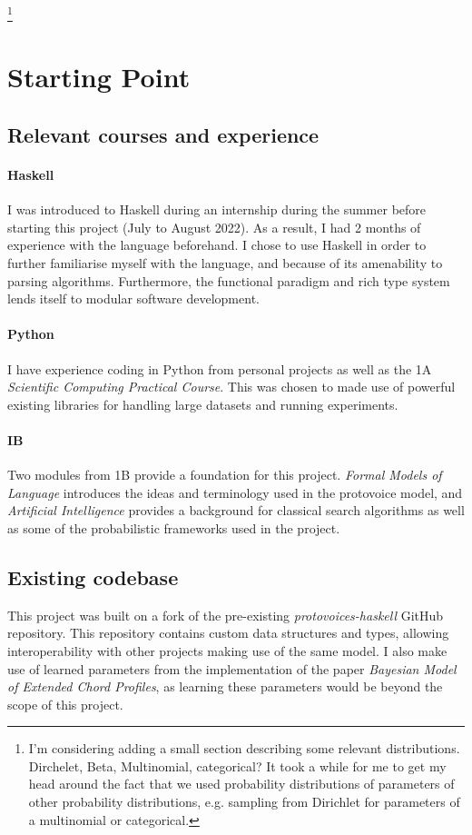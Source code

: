 \documentclass[12pt,a4paper,twoside,openright]{report}
\theoremstyle{definition}
\begin{document}
\footnote{I'm considering adding a small section describing some relevant distributions. Dirchelet, Beta, Multinomial, categorical? It took a while for me to get my head around the fact that we used probability distributions of parameters of other probability distributions, e.g. sampling from Dirichlet for parameters of a multinomial or categorical.}

\section{Starting Point}

\subsection{Relevant courses and experience}

\paragraph{Haskell}{I was introduced to Haskell during an internship during the summer before starting this project (July to August 2022). As a result, I had 2 months of experience with the language beforehand. I chose to use Haskell in order to further familiarise myself with the language, and because of its amenability to parsing algorithms. Furthermore, the functional paradigm and rich type system lends itself to modular software development.}

\paragraph{Python}{I have experience coding in Python from personal projects as well as the 1A \textit{Scientific Computing Practical Course}. This was chosen to made use of powerful existing libraries for handling large datasets and running experiments. }

\paragraph{IB}{ Two modules from 1B provide a foundation for this project. \textit{Formal Models of Language} introduces the ideas and terminology used in the protovoice model, and \textit{Artificial Intelligence} provides a background for classical search algorithms as well as some of the probabilistic frameworks used in the project.}

\subsection{Existing codebase}
This project was built on a fork of the pre-existing \textit{protovoices-haskell} GitHub repository. This repository contains custom data structures and types, allowing interoperability with other projects making use of the same model. I also make use of learned parameters from the implementation of the paper \textit{Bayesian Model of Extended Chord Profiles}\cite{finkensiepChordTypesOrnamentation2023}, as learning these parameters would be beyond the scope of this project. 
\end{document}
